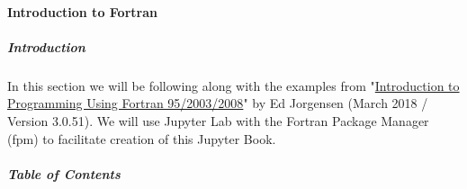 \paragraph{Introduction to Fortran}

\subparagraph{Introduction}

In this section we will be following along with the examples from "\href{https://open.umn.edu/opentextbooks/textbooks/introduction-to-programming-using-fortran-95-2003-2008}{Introduction to Programming Using Fortran 95/2003/2008}" by Ed Jorgensen (March 2018 / Version 3.0.51).  We will use Jupyter Lab with the Fortran Package Manager (fpm) to facilitate creation of this Jupyter Book.

\subparagraph{Table of Contents}